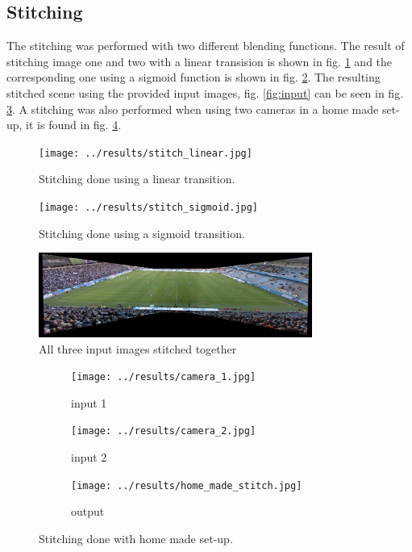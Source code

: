 \subsection{Stitching}
The stitching was performed with two different blending functions.
The result of stitching image one and two with a linear transision is shown in fig. \ref{fig:results:stitching:linear} and the corresponding one using a sigmoid function is shown in fig. \ref{fig:results:stitching:sigmoid}.
The resulting stitched scene using the provided input images, fig. \ref{fig:input} can be seen in fig. \ref{fig:res_stitch}.
A stitching was also performed when using two cameras in a home made set-up, it is found in fig. \ref{fig:results:stitching:homemade}.

\begin{figure}[H]
  \centering
  \texttt{[image: ../results/stitch\_linear.jpg]}
  \caption{Stitching done using a linear transition.}
  \label{fig:results:stitching:linear}
\end{figure}

\begin{figure}[H]
  \centering
  \texttt{[image: ../results/stitch\_sigmoid.jpg]}
  \caption{Stitching done using a sigmoid transition.}
  \label{fig:results:stitching:sigmoid}
\end{figure}

\begin{figure}
	\centering
	\includegraphics[width=0.8\textwidth]{../results/images/res_stitch.PNG}
	\caption{All three input images stitched together}
	\label{fig:res_stitch}
\end{figure}

\begin{figure}
	\centering
	\begin{subfigure}[t]{0.3\textwidth}
		\centering
		\texttt{[image: ../results/camera\_1.jpg]}
		\caption{input 1}
	\end{subfigure}
	\begin{subfigure}[t]{0.3\textwidth}
		\centering
		\texttt{[image: ../results/camera\_2.jpg]}
		\caption{input 2}
	\end{subfigure}
		\begin{subfigure}[t]{0.3\textwidth}
		\centering
                \texttt{[image: ../results/home\_made\_stitch.jpg]}
		\caption{output}
	\end{subfigure}
        \caption{Stitching done with home made set-up.}
	\label{fig:results:stitching:homemade}
\end{figure}

